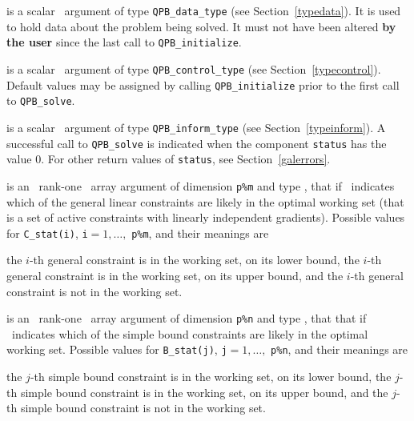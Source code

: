 \documentclass{galahad}
\newcommand{\packagename}{QPB}
\begin{document}
\begin{description}
 is a scalar \intentinout\ argument of type 
{\tt \packagename\_data\_type}
(see Section~\ref{typedata}). It is used to hold data about the problem being 
solved. It must not have been altered {\bf by the user} since the last call to 
{\tt \packagename\_initialize}.

 is a scalar \intentin\ argument of type 
{\tt \packagename\_control\_type}
(see Section~\ref{typecontrol}). Default values may be assigned by calling 
{\tt \packagename\_initialize} prior to the first call to 
{\tt \packagename\_solve}.

 is a scalar \intentout\ argument of type 
{\tt \packagename\_inform\_type}
(see Section~\ref{typeinform}). A successful call to
{\tt \packagename\_solve}
is indicated when the  component {\tt status} has the value 0. 
For other return values of {\tt status}, see Section~\ref{galerrors}.

 is an \optional\ rank-one \intentout\ array argument 
of dimension {\tt p\%m}
and type \integer, that if \present\
indicates which of the general linear
constraints are likely in the optimal working set (that is a set of active
constraints with linearly independent gradients). Possible values for 
{\tt C\_stat(i)}, {\tt i}$=1, \ldots ,$ {\tt p\%m}, and their meanings are
\begin{description}
 the $i$-th general constraint 
is in the working set, on its lower bound,
 the $i$-th general constraint 
is in the working set, on its upper bound, and
  the $i$-th general constraint is not in the working set.
\end{description}

 is an \optional\ rank-one \intentout\ array argument 
of dimension {\tt p\%n}
and type \integer, that that if \present\
indicates which of the simple bound 
constraints are likely in the optimal working set. Possible values for 
{\tt B\_stat(j)}, {\tt j}$=1, \ldots ,$ {\tt p\%n}, and their meanings are
\begin{description}
\itt{<0} the $j$-th simple bound constraint 
is in the working set, on its lower bound,
\itt{>0} the $j$-th simple bound constraint 
is in the working set, on its upper bound, and
\itt{0}  the $j$-th simple bound constraint is not in the working set.
\end{description}


\end{description}
\end{document}
